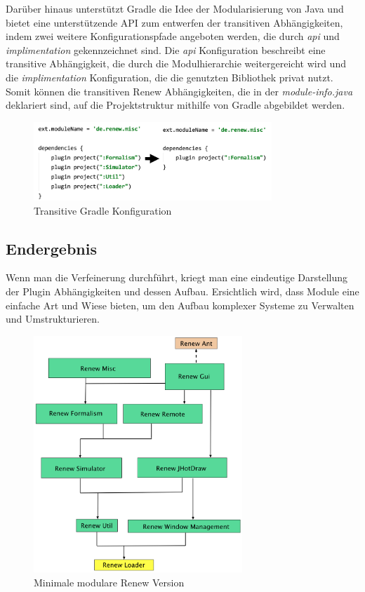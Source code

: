 	Darüber hinaus unterstützt Gradle die Idee der Modularisierung von Java und bietet eine unterstützende API zum entwerfen der transitiven Abhängigkeiten, indem zwei weitere Konfigurationspfade angeboten werden, die durch \textit{api} und \textit{implimentation} gekennzeichnet sind. Die \textit{api} Konfiguration beschreibt eine transitive Abhängigkeit, die durch die Modulhierarchie weitergereicht wird und die \textit{implimentation} Konfiguration, die die genutzten Bibliothek privat nutzt. Somit können die transitiven Renew Abhängigkeiten, die in der \textit{module-info.java} deklariert sind, auf die Projektstruktur mithilfe von Gradle abgebildet werden. 
	\begin{figure}[h!]
	  \centering
	  \includegraphics[width=0.8\textwidth]{material/images/gradle_misc.png}
	  \caption{Transitive Gradle Konfiguration}
	  \label{fig:trans_gradle}
	\end{figure}

\subsection{Endergebnis} \label{sub:endergebnis}
	
	Wenn man die Verfeinerung durchführt, kriegt man eine eindeutige Darstellung der Plugin Abhängigkeiten und dessen Aufbau. Ersichtlich wird, dass Module eine einfache Art und Wiese bieten, um den Aufbau komplexer Systeme zu Verwalten und Umstrukturieren.    
	\begin{figure}[t]
	  \centering
	  \includegraphics[width=0.7\textwidth]{material/images/tree_trans.png}
	  \caption{Minimale modulare Renew Version}
	  \label{fig:trans_config}
	\end{figure}



